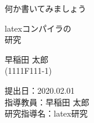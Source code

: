 \begin{titlepage}
  \begin{center}
    \vspace*{3cm}

    何か書いてみましょう\\
    \vspace{1cm}

      latexコンパイラの\\
      研究\\
    \vspace{7.5cm}

    早稲田 太郎 \\
    (1111F111-1) \\
    \vspace{1cm}

    提出日：2020.02.01\\
    指導教員：早稲田 太郎\\
    研究指導名：latex研究\\
  \end{center}
\end{titlepage}





